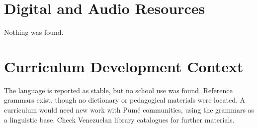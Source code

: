 \documentclass[12pt]{article}
\begin{document}
\section{Digital and Audio Resources}
Nothing was found.

\section{Curriculum Development Context}
The language is reported as stable, but no school use was found. Reference grammars exist, though no dictionary or pedagogical materials were located. A curriculum would need new work with Pum\'e communities, using the grammars as a linguistic base. Check Venezuelan library catalogues for further materials.
\end{document}
